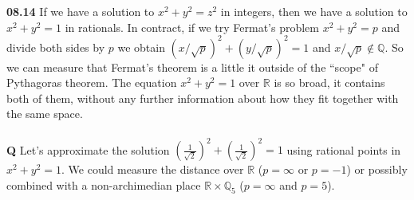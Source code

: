 \documentclass[12pt]{article}
\begin{document}
\noindent \textbf{08.14} If we have a solution to $x^2 + y^2 = z^2$ in integers, then we have a solution to $x^2 + y^2 = 1$ in rationals.  In contract, if we try Fermat's problem $x^2 + y^2 = p$ and divide both sides by $p$ we obtain $(x/\sqrt{p})^2 + (y/\sqrt{p})^2 = 1$ and $x/\sqrt{p} \notin \mathbb{Q}$.  So we can measure that Fermat's theorem is a little it outside of the ``scope" of Pythagoras theorem.  The equation $x^2 + y^2 = 1$ over $\mathbb{R}$ is so broad, it contains both of them, without any further information about how they fit together with the same space. \\ \\
\textbf{Q} Let's approximate the solution $(\frac{1}{\sqrt{2}})^2 + (\frac{1}{\sqrt{2}})^2 = 1$ using rational points in $x^2 + y^2 = 1$.  We could measure the distance over $\mathbb{R}$ ($p = \infty$ or $p = -1$) or possibly combined with a non-archimedian place $\mathbb{R} \times \mathbb{Q}_5$  ($p = \infty$ and $p = 5$). 
\end{document}
